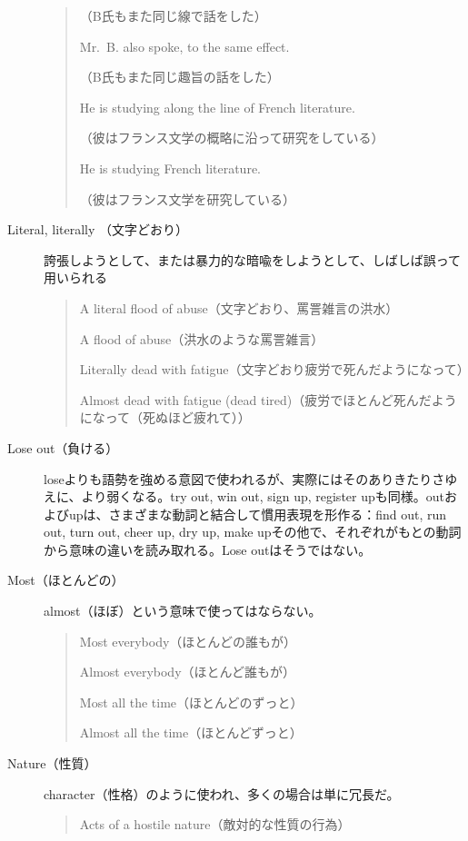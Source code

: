 \begin{description}
\begin{quote}
    （B氏もまた同じ線で話をした）
    
    Mr.~B. also spoke, to the same effect.
    
    （B氏もまた同じ趣旨の話をした）
    
    He is studying along the line of French literature.
    
    （彼はフランス文学の概略に沿って研究をしている）
    
    He is studying French literature.
    
    （彼はフランス文学を研究している）
    \end{quote}
\item [Literal, literally （文字どおり）]誇張しようとして、または暴力的な暗喩をしようとして、しばしば誤って用いられる
\begin{quote}
    A literal flood of abuse（文字どおり、罵詈雑言の洪水）
    
    A flood of abuse（洪水のような罵詈雑言）
    
    Literally dead with fatigue（文字どおり疲労で死んだようになって）
    
    Almost dead with fatigue (dead tired)（疲労でほとんど死んだようになって（死ぬほど疲れて））
\end{quote}
\item [ Lose out（負ける） ]loseよりも語勢を強める意図で使われるが、実際にはそのありきたりさゆえに、より弱くなる。try
out, win out, sign up, register
upも同様。outおよびupは、さまざまな動詞と結合して慣用表現を形作る：find
out, run out, turn out, cheer up, dry up, make
upその他で、それぞれがもとの動詞から意味の違いを読み取れる。Lose
outはそうではない。
\item [Most（ほとんどの）] almost（ほぼ）という意味で使ってはならない。
\begin{quote}
    Most everybody（ほとんどの誰もが）
    
    Almost everybody（ほとんど誰もが）
    
    Most all the time（ほとんどのずっと）
    
    Almost all the time（ほとんどずっと）
\end{quote}
\item [Nature（性質）]character（性格）のように使われ、多くの場合は単に冗長だ。
\begin{quote}
    Acts of a hostile nature（敵対的な性質の行為）
    

\end{quote}
\end{description}

